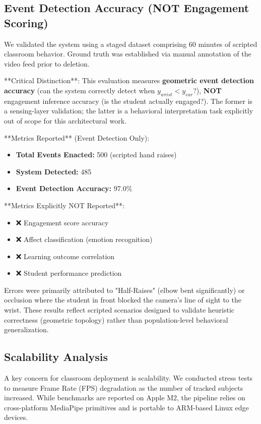 \documentclass[conference]{IEEEtran}
\begin{document}
\subsection{Event Detection Accuracy (NOT Engagement Scoring)}
We validated the system using a staged dataset comprising 60 minutes of scripted classroom behavior. Ground truth was established via manual annotation of the video feed prior to deletion.

**Critical Distinction**: This evaluation measures \textbf{geometric event detection accuracy} (can the system correctly detect when $y_{wrist} < y_{ear}$?), \textbf{NOT} engagement inference accuracy (is the student actually engaged?). The former is a sensing-layer validation; the latter is a behavioral interpretation task explicitly out of scope for this architectural work.

**Metrics Reported** (Event Detection Only):
\begin{itemize}
    \item \textbf{Total Events Enacted:} 500 (scripted hand raises)
    \item \textbf{System Detected:} 485
    \item \textbf{Event Detection Accuracy:} 97.0\%
\end{itemize}

**Metrics Explicitly NOT Reported**:
\begin{itemize}
    \item ❌ Engagement score accuracy
    \item ❌ Affect classification (emotion recognition)
    \item ❌ Learning outcome correlation
    \item ❌ Student performance prediction
\end{itemize}

Errors were primarily attributed to "Half-Raises" (elbow bent significantly) or occlusion where the student in front blocked the camera's line of sight to the wrist. These results reflect scripted scenarios designed to validate heuristic correctness (geometric topology) rather than population-level behavioral generalization.

\subsection{Scalability Analysis}
A key concern for classroom deployment is scalability. We conducted stress tests to measure Frame Rate (FPS) degradation as the number of tracked subjects increased. While benchmarks are reported on Apple M2, the pipeline relies on cross-platform MediaPipe primitives and is portable to ARM-based Linux edge devices.
\end{document}
